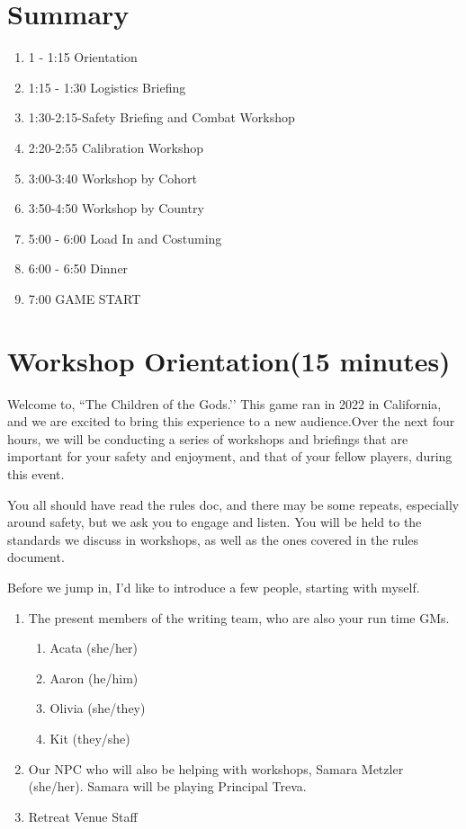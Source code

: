 \documentclass[green]{GL2020}
\begin{document}
\name{\gPreGameSafety{}}

\section*{Summary}
\begin{enumerate}
	\item 1 - 1:15 Orientation
	\item 1:15 - 1:30 Logistics Briefing
	\item 1:30-2:15-Safety Briefing and Combat Workshop
	\item 2:20-2:55 Calibration Workshop
	\item 3:00-3:40 Workshop by Cohort
	\item 3:50-4:50 Workshop by Country
	\item 5:00 - 6:00 Load In and Costuming
	\item 6:00 - 6:50 Dinner
	\item 7:00 GAME START
\end{enumerate}

\section*{Workshop Orientation(15 minutes)}
Welcome to, ``The Children of the Gods.’’ This game ran in 2022 in California, and we are excited to bring this experience to a new audience.Over the next four hours, we will be conducting a series of workshops and briefings that are important for your safety and enjoyment, and that of your fellow players, during this event. 

You all should have read the rules doc, and there may be some repeats, especially around safety, but we ask you to engage and listen. You will be held to the standards we discuss in workshops, as well as the ones covered in the rules document.

Before we jump in, I’d like to introduce a few people, starting with myself.
\begin{enumerate}
	\item The present members of the writing team, who are also your run time GMs. 	
	\begin{enumerate}
		\item Acata (she/her)
		\item Aaron (he/him)
		\item Olivia (she/they)
		\item Kit (they/she)
	\end{enumerate}
	\item Our NPC who will also be helping with workshops, Samara Metzler (she/her).  Samara will be playing Principal Treva.  
	\item Retreat Venue Staff
\end{enumerate}
\end{document}
